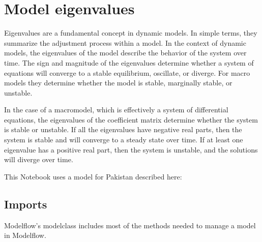 \documentclass[letterpaper,10pt,english]{jupyterBook}
\begin{document}
\chapter{Model eigenvalues}
\label{\detokenize{content/06_ModelAnalytics/EigenValues:model-eigenvalues}}\label{\detokenize{content/06_ModelAnalytics/EigenValues::doc}}
\sphinxAtStartPar
Eigenvalues are a fundamental concept in dynamic models. In simple terms, they summarize the adjustment process within a model. In the context of dynamic models, the eigenvalues of the model describe the behavior of the system over time. The sign and magnitude of the eigenvalues determine whether a system of equations will converge to a stable equilibrium, oscillate, or diverge. For macro models they determine whether the model is stable, marginally stable, or unstable.

\sphinxAtStartPar
In the case of a macromodel, which is effectively a system of differential equations, the eigenvalues of the coefficient matrix determine whether the system is stable or unstable. If all the eigenvalues have negative real parts, then the system is stable and will converge to a steady state over time. If at least one eigenvalue has a positive real part, then the system is unstable, and the solutions will diverge over time.

\sphinxAtStartPar
This Notebook uses a  model for Pakistan described here: 


\section{Imports}
\label{\detokenize{content/06_ModelAnalytics/EigenValues:imports}}
\sphinxAtStartPar
Modelflow’s modelclass includes most of the methods needed to manage a model in Modelflow.
\end{document}
